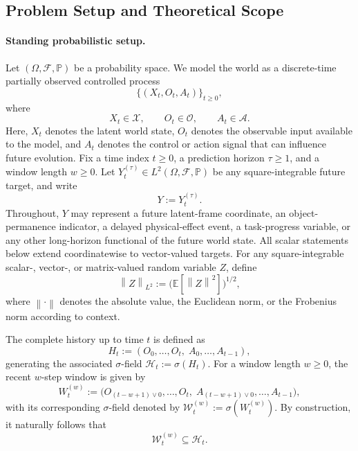 \documentclass{llmxive}
\providecommand{\E}{\mathbb{E}}
\providecommand{\Prob}{\mathbb{P}}
\providecommand{\cF}{\mathcal{F}}
\providecommand{\cH}{\mathcal{H}}
\providecommand{\cW}{\mathcal{W}}
\providecommand{\norm}[1]{\left\lVert #1 \right\rVert}
\begin{document}
\subsection{Problem Setup and Theoretical Scope}
\label{subsec:theory_setup}



\paragraph{\textbf{Standing probabilistic setup.}}
Let $(\Omega,\cF,\Prob)$ be a probability space.
We model the world as a discrete-time partially observed controlled process
\[
\{(X_t,O_t,A_t)\}_{t\ge 0},
\]
where
\[
X_t \in \mathcal X,
\qquad
O_t \in \mathcal O,
\qquad
A_t \in \mathcal A.
\]
Here, $X_t$ denotes the latent world state, $O_t$ denotes the observable input available to the model, and $A_t$ denotes the control or action signal that can influence future evolution. Fix a time index $t\ge 0$, a prediction horizon $\tau \ge 1$, and a window length $w\ge 0$. Let $Y_t^{(\tau)} \in L^2(\Omega,\cF,\Prob)$
be any square-integrable future target, and write
\[
Y := Y_t^{(\tau)}.
\]
Throughout, $Y$ may represent a future latent-frame coordinate, an object-permanence indicator, a delayed physical-effect event, a task-progress variable, or any other long-horizon functional of the future world state. All scalar statements below extend coordinatewise to vector-valued targets. For any square-integrable scalar-, vector-, or matrix-valued random variable $Z$, define
\[
\norm{Z}_{L^2} := \bigl(\E[\norm{Z}^2]\bigr)^{1/2},
\]
where $\norm{\cdot}$ denotes the absolute value, the Euclidean norm, or the Frobenius norm according to context.

\begin{definition}
\label{def:history_window}
The complete history up to time $t$ is defined as
\begin{equation}
H_t := (O_0,\dots,O_t,\; A_0,\dots,A_{t-1}),
\label{eq:history_def}
\end{equation}
generating the associated $\sigma$-field $\cH_t := \sigma(H_t)$. For a  window length $w \ge 0$, the recent $w$-step window is given by
\begin{equation}
W_t^{(w)}
:=
\bigl(
O_{(t-w+1)\vee 0},\dots,O_t,\;
A_{(t-w+1)\vee 0},\dots,A_{t-1}
\bigr),
\label{eq:window_def}
\end{equation}
with its corresponding $\sigma$-field denoted by $\cW_t^{(w)} := \sigma(W_t^{(w)})$. By construction, it naturally follows that
\begin{equation}
\cW_t^{(w)} \subseteq \cH_t.
\label{eq:window_subset_history}
\end{equation}
\end{definition}
\end{document}
